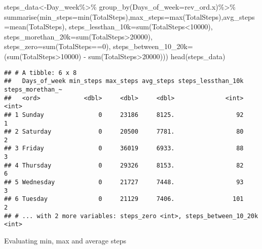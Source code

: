 \documentclass[
]{article}
\newenvironment{Shaded}{\begin{snugshade}}{\end{snugshade}}
\newcommand{\AttributeTok}[1]{\textcolor[rgb]{0.77,0.63,0.00}{#1}}
\newcommand{\DecValTok}[1]{\textcolor[rgb]{0.00,0.00,0.81}{#1}}
\newcommand{\FunctionTok}[1]{\textcolor[rgb]{0.00,0.00,0.00}{#1}}
\newcommand{\NormalTok}[1]{#1}
\newcommand{\OtherTok}[1]{\textcolor[rgb]{0.56,0.35,0.01}{#1}}
\newcommand{\SpecialCharTok}[1]{\textcolor[rgb]{0.00,0.00,0.00}{#1}}
\begin{document}
\begin{Shaded}
\begin{Highlighting}[]
\NormalTok{steps\_data}\OtherTok{\textless{}{-}}\NormalTok{Day\_week}\SpecialCharTok{\%\textgreater{}\%}
  \FunctionTok{group\_by}\NormalTok{(}\AttributeTok{Days\_of\_week=}\NormalTok{rev\_ord.x)}\SpecialCharTok{\%\textgreater{}\%}
  \FunctionTok{summarise}\NormalTok{(}\AttributeTok{min\_steps=}\FunctionTok{min}\NormalTok{(TotalSteps),}\AttributeTok{max\_steps=}\FunctionTok{max}\NormalTok{(TotalSteps),}\AttributeTok{avg\_steps=}\FunctionTok{mean}\NormalTok{(TotalSteps), }\AttributeTok{steps\_lessthan\_10k=}\FunctionTok{sum}\NormalTok{(TotalSteps}\SpecialCharTok{\textless{}}\DecValTok{10000}\NormalTok{), }\AttributeTok{steps\_morethan\_20k=}\FunctionTok{sum}\NormalTok{(TotalSteps}\SpecialCharTok{\textgreater{}}\DecValTok{20000}\NormalTok{), }\AttributeTok{steps\_zero=}\FunctionTok{sum}\NormalTok{(TotalSteps}\SpecialCharTok{==}\DecValTok{0}\NormalTok{), }\AttributeTok{steps\_between\_10\_20k=}\NormalTok{(}\FunctionTok{sum}\NormalTok{(TotalSteps}\SpecialCharTok{\textgreater{}}\DecValTok{10000}\NormalTok{) }\SpecialCharTok{{-}} \FunctionTok{sum}\NormalTok{(TotalSteps}\SpecialCharTok{\textgreater{}}\DecValTok{20000}\NormalTok{)))}
\FunctionTok{head}\NormalTok{(steps\_data)}
\end{Highlighting}
\end{Shaded}

\begin{verbatim}
## # A tibble: 6 x 8
##   Days_of_week min_steps max_steps avg_steps steps_lessthan_10k steps_morethan_~
##   <ord>            <dbl>     <dbl>     <dbl>              <int>            <int>
## 1 Sunday               0     23186     8125.                 92                1
## 2 Saturday             0     20500     7781.                 80                2
## 3 Friday               0     36019     6933.                 88                3
## 4 Thursday             0     29326     8153.                 82                6
## 5 Wednesday            0     21727     7448.                 93                3
## 6 Tuesday              0     21129     7406.                101                2
## # ... with 2 more variables: steps_zero <int>, steps_between_10_20k <int>
\end{verbatim}

Evaluating min, max and average steps
\end{document}
